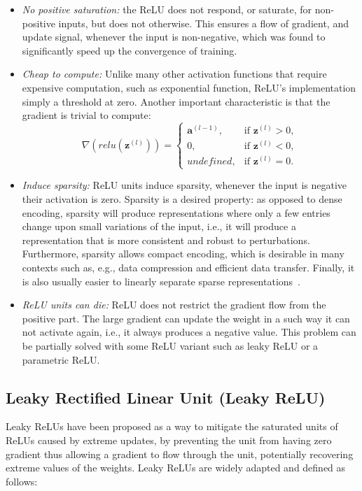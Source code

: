 \begin{itemize}
    \item \emph{No positive saturation:} the ReLU does not respond, or saturate, for non-positive inputs, but does not otherwise. This ensures a flow of gradient, and update signal, whenever the input is non-negative, which was found to significantly speed up the convergence of training.
    \item \emph{Cheap to compute:} Unlike many other activation functions that require expensive computation, such as exponential function, ReLU's implementation simply a threshold at zero. Another important characteristic is that the gradient is trivial to compute\cite{krizhevsky2012imagenet}:
        \begin{equation}\label{eq:relu_derivative}
            \nabla (relu(\mathbf{z}^{(l)})) =
                \begin{cases}
                    \mathbf{a}^{(l-1)},  & \text{if } \mathbf{z}^{(l)} > 0 ,\\
                    0, & \text{if } \mathbf{z}^{(l)} < 0 ,\\
                    undefined,  & \text{if } \mathbf{z}^{(l)} = 0.
                \end{cases}
        \end{equation}

    \item \emph{Induce sparsity:} ReLU units induce sparsity, whenever the input is negative their activation is zero. Sparsity is a desired property: as opposed to dense encoding, sparsity will produce representations where only a few entries change upon small variations of the input, i.e., it will produce a representation that is more consistent and robust to perturbations. Furthermore, sparsity allows compact encoding, which is desirable in many contexts such as, e.g., data compression and efficient data transfer.  Finally, it is also usually easier to linearly separate sparse representations~\cite{GlorotDeep2011}.
    \item \emph{ReLU units can die:} 
    ReLU does not restrict the gradient flow from the positive part. The large gradient can update the weight in a such way it can not activate again, i.e., it always produces a negative value. This problem can be partially solved with some ReLU variant such as leaky ReLU or a parametric ReLU.  
\end{itemize}

\subsection{Leaky Rectified Linear Unit (Leaky ReLU)}\label{sec:lrelu}
Leaky ReLUs \cite{krizhevsky2012imagenet} have been proposed as a way to mitigate the saturated units of ReLUs caused by extreme updates, by preventing the unit from having zero gradient thus allowing a  gradient to flow through the unit, potentially recovering extreme values of the weights. Leaky ReLUs are widely adapted and defined as follows\cite{krizhevsky2012imagenet}:

